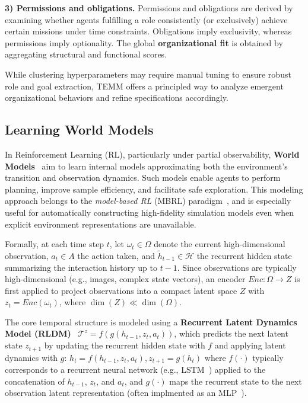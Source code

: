 \documentclass[pdflatex,sn-mathphys-num]{sn-jnl}%
\theoremstyle{thmstyleone}%
\theoremstyle{thmstyletwo}%
\theoremstyle{thmstylethree}%
\begin{document}
\textbf{3) Permissions and obligations.} \quad Permissions and obligations are derived by examining whether agents fulfilling a role consistently (or exclusively) achieve certain missions under time constraints. Obligations imply exclusivity, whereas permissions imply optionality. The global \textbf{organizational fit} is obtained by aggregating structural and functional scores.

While clustering hyperparameters may require manual tuning to ensure robust role and goal extraction, TEMM offers a principled way to analyze emergent organizational behaviors and refine specifications accordingly.



\subsection{Learning World Models}

In Reinforcement Learning (RL), particularly under partial observability, \textbf{World Models}~\cite{ha2018recurrent, hafner2020dream} aim to learn internal models approximating both the environment's transition and observation dynamics. Such models enable agents to perform planning, improve sample efficiency, and facilitate safe exploration. This modeling approach belongs to the \textit{model-based RL} (MBRL) paradigm~\cite{moerland2020model}, and is especially useful for automatically constructing high-fidelity simulation models even when explicit environment representations are unavailable.

Formally, at each time step $t$, let $\omega_t \in \Omega$ denote the current high-dimensional observation, $a_t \in A$ the action taken, and $\tilde{h}_{t-1} \in \mathcal{H}$ the recurrent hidden state summarizing the interaction history up to $t-1$. Since observations are typically high-dimensional (e.g., images, complex state vectors), an encoder $Enc: \Omega \rightarrow Z$ is first applied to project observations into a compact latent space $Z$ with $z_t = Enc(\omega_t)$, where $\dim(Z) \ll \dim(\Omega)$.

The core temporal structure is modeled using a \textbf{Recurrent Latent Dynamics Model (RLDM)}~\cite{hafner2020dream} $\mathcal{T}^{z} = f(g(h_{t-1},z_t, a_t))$, which predicts the next latent state $z_{t+1}$ by updating the recurrent hidden state with $f$ and applying latent dynamics with $g$:
$h_t = f(h_{t-1}, z_t, a_t), z_{t+1} = g(h_t)$
where $f(\cdot)$ typically corresponds to a recurrent neural network (e.g., LSTM~\cite{hochreiter1997long}) applied to the concatenation of $h_{t-1}$, $z_t$, and $a_t$, and $g(\cdot)$ maps the recurrent state to the next observation latent representation (often implmented as an MLP~\cite{hochreiter1997long}).
\end{document}
